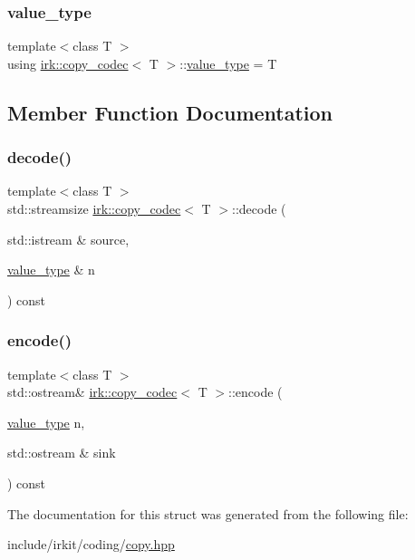 \subsubsection{\texorpdfstring{value\+\_\+type}{value\_type}}
{\footnotesize\ttfamily template$<$class T $>$ \\
using \mbox{\hyperlink{structirk_1_1copy__codec}{irk\+::copy\+\_\+codec}}$<$ T $>$\+::\mbox{\hyperlink{structirk_1_1copy__codec_a6a94e8da5a0a582eaa667741175a3c05}{value\+\_\+type}} =  T}



\subsection{Member Function Documentation}
\mbox{\label{structirk_1_1copy__codec_ac72b2a5dbfdf57e39f7ed1d12d7bb8f3}} 
\subsubsection{\texorpdfstring{decode()}{decode()}}
{\footnotesize\ttfamily template$<$class T $>$ \\
std\+::streamsize \mbox{\hyperlink{structirk_1_1copy__codec}{irk\+::copy\+\_\+codec}}$<$ T $>$\+::decode (\begin{DoxyParamCaption}\item[{std\+::istream \&}]{source,  }\item[{\mbox{\hyperlink{structirk_1_1copy__codec_a6a94e8da5a0a582eaa667741175a3c05}{value\+\_\+type}} \&}]{n }\end{DoxyParamCaption}) const\hspace{0.3cm}{\ttfamily [inline]}}

\mbox{\label{structirk_1_1copy__codec_a72a66688818ee37592ee6fe5e25ec3cb}} 
\subsubsection{\texorpdfstring{encode()}{encode()}}
{\footnotesize\ttfamily template$<$class T $>$ \\
std\+::ostream\& \mbox{\hyperlink{structirk_1_1copy__codec}{irk\+::copy\+\_\+codec}}$<$ T $>$\+::encode (\begin{DoxyParamCaption}\item[{\mbox{\hyperlink{structirk_1_1copy__codec_a6a94e8da5a0a582eaa667741175a3c05}{value\+\_\+type}}}]{n,  }\item[{std\+::ostream \&}]{sink }\end{DoxyParamCaption}) const\hspace{0.3cm}{\ttfamily [inline]}}



The documentation for this struct was generated from the following file\+:\begin{DoxyCompactItemize}
\item 
include/irkit/coding/\mbox{\hyperlink{copy_8hpp}{copy.\+hpp}}\end{DoxyCompactItemize}

